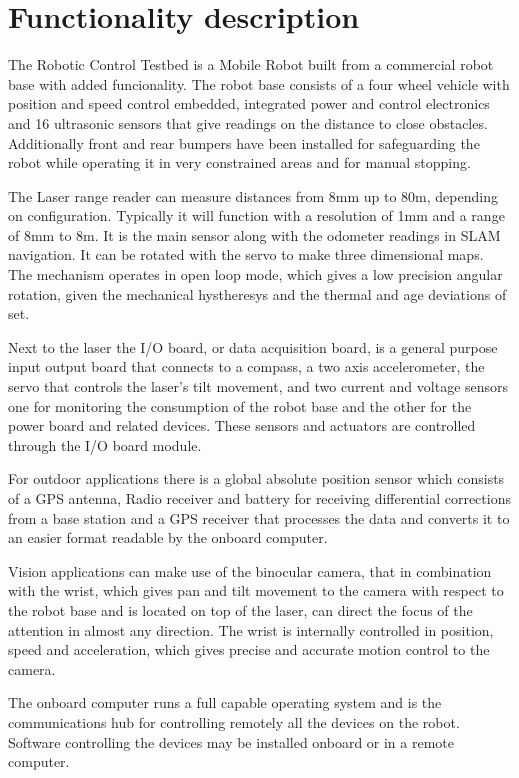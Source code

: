 \section{Functionality description}
\label{sec:usermanual_func}
The Robotic Control Testbed is a Mobile Robot built from a commercial robot base with added funcionality.
The robot base consists of a four wheel vehicle with position and speed control embedded, integrated power and control
electronics and 16 ultrasonic sensors that give readings on the distance to close obstacles. Additionally front and
rear bumpers have been installed for safeguarding the robot while operating it
in very constrained areas and for manual stopping.

The Laser range reader can measure distances from 8mm up to 80m, depending on configuration. Typically it will function
with a resolution of 1mm and a range of 8mm to 8m. It is the main sensor along with the odometer readings in SLAM
navigation. It can be rotated with the servo to make three dimensional maps. The mechanism operates in open loop
mode, which gives a low precision angular rotation, given the mechanical hystheresys and the thermal and age deviations
of set.

Next to the laser the I/O board, or data acquisition board, is a general purpose input output board that connects to a compass, a two axis accelerometer,
the servo that controls the laser's tilt movement, and two current and voltage sensors one for monitoring the consumption of the robot base and the other for the power board and related devices. These sensors and actuators are controlled through the I/O board module.

For outdoor applications there is a global absolute position sensor which consists of a GPS antenna,
Radio receiver and battery for receiving differential corrections from a base station and a GPS receiver that
processes the data and converts it to an easier format readable by the onboard computer.

Vision applications can make use of the binocular camera, that in combination with the wrist, which gives pan and
tilt movement to the camera with respect to the robot base and is located on top of the laser, can direct the
focus of the attention in almost any direction. The wrist is internally controlled in position, speed and acceleration,
which gives precise and accurate motion control to the camera.

The onboard computer runs a full capable operating system and is the communications hub for controlling remotely
all the devices on the robot. Software controlling the devices may be installed onboard or in a remote computer.

